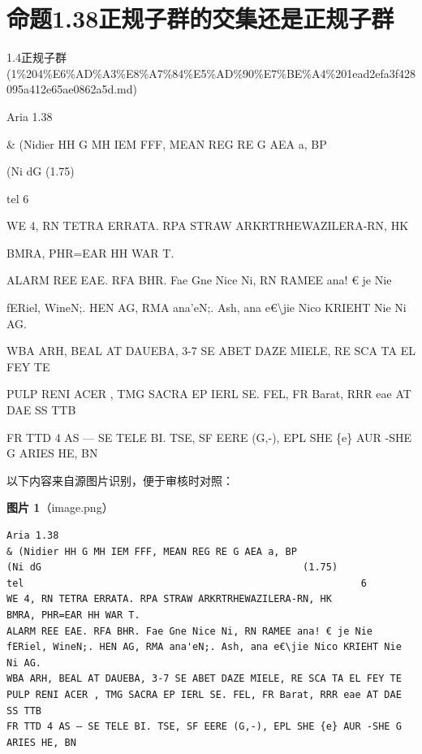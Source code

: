\section*{命题1.38正规子群的交集还是正规子群}

\begin{note}[来源上级主题]

1.4正规子群 (1\%204\%E6\%AD\%A3\%E8\%A7\%84\%E5\%AD\%90\%E7\%BE\%A4\%201ead2efa3f428095a412e65ae0862a5d.md)

\end{note}

\begin{proposition}[命题1.38正规子群的交集还是正规子群]

Aria 1.38

\& (Nidier HH G MH IEM FFF, MEAN REG RE G AEA a, BP

(Ni dG                                             (1.75)

tel                                                          6

WE 4, RN TETRA ERRATA. RPA STRAW ARKRTRHEWAZILERA-RN, HK

BMRA, PHR=EAR HH WAR T.

ALARM REE EAE. RFA BHR. Fae Gne Nice Ni, RN RAMEE ana! € je Nie

fERiel, WineN;. HEN AG, RMA ana'eN;. Ash, ana e€\textbackslash{}jie Nico KRIEHT Nie Ni AG.

WBA ARH, BEAL AT DAUEBA, 3-7 SE ABET DAZE MIELE, RE SCA TA EL FEY TE

PULP RENI ACER , TMG SACRA EP IERL SE. FEL, FR Barat, RRR eae AT DAE SS TTB

FR TTD 4 AS — SE TELE BI. TSE, SF EERE (G,-), EPL SHE \{e\} AUR -SHE G ARIES HE, BN

\end{proposition}

\begin{note}
以下内容来自源图片识别，便于审核时对照：

\textbf{图片 1}（image.png）
\begin{Verbatim}[fontsize=\small]
Aria 1.38
& (Nidier HH G MH IEM FFF, MEAN REG RE G AEA a, BP
(Ni dG                                             (1.75)
tel                                                          6
WE 4, RN TETRA ERRATA. RPA STRAW ARKRTRHEWAZILERA-RN, HK
BMRA, PHR=EAR HH WAR T.
ALARM REE EAE. RFA BHR. Fae Gne Nice Ni, RN RAMEE ana! € je Nie
fERiel, WineN;. HEN AG, RMA ana'eN;. Ash, ana e€\jie Nico KRIEHT Nie Ni AG.
WBA ARH, BEAL AT DAUEBA, 3-7 SE ABET DAZE MIELE, RE SCA TA EL FEY TE
PULP RENI ACER , TMG SACRA EP IERL SE. FEL, FR Barat, RRR eae AT DAE SS TTB
FR TTD 4 AS — SE TELE BI. TSE, SF EERE (G,-), EPL SHE {e} AUR -SHE G ARIES HE, BN
\end{Verbatim}

\end{note}

